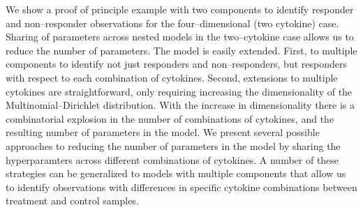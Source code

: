 \documentclass[11pt]{article}
\begin{document}
We show a proof of principle example with two components to identify responder and non--responder observations for the four--dimensional (two cytokine) case. Sharing of parameters across nested models in the two--cytokine case allows us to reduce the number of parameters. The model is easily extended. First, to multiple components to identify not just responders and non--responders, but responders with respect to each combination of cytokines. Second, extensions to multiple cytokines are straightforward, only requiring increasing the dimensionality of the Multinomial--Dirichlet distribution. With the increase in dimensionality there is a combinatorial explosion in the number of combinations of cytokines, and the resulting number of parameters in the model. We present several possible approaches to reducing the number of parameters in the model by sharing the hyperparamters across different combinations of cytokines. A number of these strategies can be generalized to models with multiple components that allow us to identify observations with differences in specific cytokine combinations between treatment and control samples.
\end{document}
